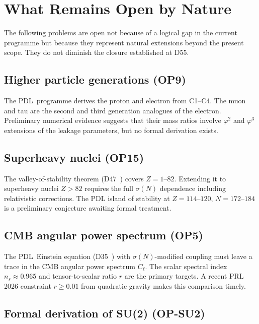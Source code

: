 \documentclass[12pt,a4paper]{article}
\theoremstyle{definition}
\newcommand{\PDL}{\textsc{PDL}}
\newcommand{\vp}{\varphi}
\begin{document}
\section{What Remains Open by Nature}
\label{sec:open}

The following problems are open not because of a logical gap in the current programme but because they represent natural extensions beyond the present scope. They do not diminish the closure established at D55.

\subsection{Higher particle generations (OP9)}

The \PDL\ programme derives the proton and electron from C1--C4. The muon and tau are the second and third generation analogues of the electron. Preliminary numerical evidence suggests that their mass ratios involve $\vp^2$ and $\vp^3$ extensions of the leakage parameters, but no formal derivation exists.

\subsection{Superheavy nuclei (OP15)}

The valley-of-stability theorem (D47~\cite{PDL_D47}) covers $Z = 1$--$82$. Extending it to superheavy nuclei $Z > 82$ requires the full $\sigma(N)$ dependence including relativistic corrections. The PDL island of stability at $Z = 114$--$120$, $N = 172$--$184$ is a preliminary conjecture awaiting formal treatment.

\subsection{CMB angular power spectrum (OP5)}

The \PDL\ Einstein equation (D35~\cite{PDL_D35}) with $\sigma(N)$-modified coupling must leave a trace in the CMB angular power spectrum $C_\ell$. The scalar spectral index $n_s \approx 0.965$ and tensor-to-scalar ratio $r$ are the primary targets. A recent PRL 2026 constraint $r \geq 0.01$ from quadratic gravity makes this comparison timely.

\subsection{Formal derivation of SU(2) (OP-SU2)}
\end{document}
